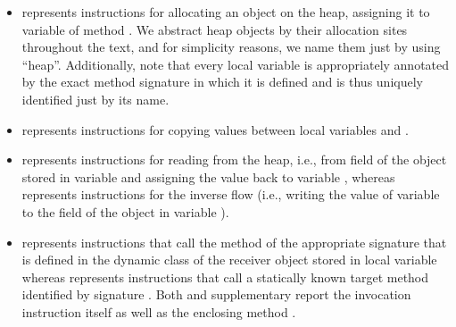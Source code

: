 \begin{itemize}
\item {} represents instructions for allocating an object  on the heap, assigning it to variable  of method . We abstract heap objects by their allocation sites throughout the text, and for simplicity reasons, we name them just by using ``heap''. Additionally, note that every local variable is appropriately annotated by the exact method signature in which it is defined and is thus uniquely identified just by its name.

\item {} represents instructions for copying values between local variables  and .

\item {} represents instructions for reading from the heap, i.e., from field  of the object stored in variable  and assigning the value back to variable , whereas  represents instructions for the inverse flow (i.e., writing the value of variable  to the field  of the object in variable ).

\item {} represents instructions that call the method of the appropriate signature  that is defined in the dynamic class of the receiver object stored in local variable  whereas  represents instructions that call a statically known target method identified by signature . Both  and  supplementary report the invocation instruction  itself as well as the enclosing method .
\end{itemize}

